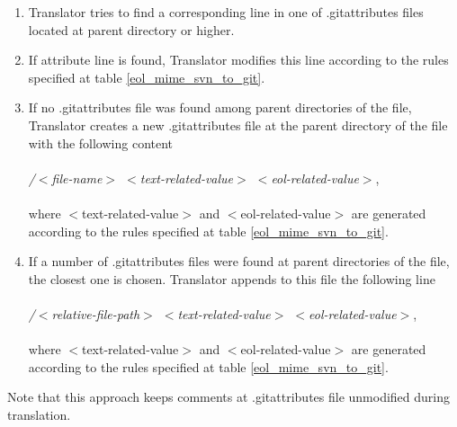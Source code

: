 \begin{enumerate}
\compactlist
\item Translator tries to find a corresponding line in one of .gitattributes files located at parent directory or higher.\\
	
\item If attribute line is found, Translator modifies this line according to the rules specified at table \ref{eol_mime_svn_to_git}.\\
	
\item If no .gitattributes file was found among parent directories of the file, Translator creates a new .gitattributes file at the parent directory of the file with the following content\\\\
\emph{/$<$file-name$>$ $<$text-related-value$>$ $<$eol-related-value$>$},\\\\
where $<$text-related-value$>$ and $<$eol-related-value$>$ are generated according to the rules specified at table \ref{eol_mime_svn_to_git}.\\
	
\item If a number of .gitattributes files were found at parent directories of the file, the closest one is chosen. Translator appends to this file the following line\\\\
\emph{/$<$relative-file-path$>$ $<$text-related-value$>$ $<$eol-related-value$>$},\\\\
where $<$text-related-value$>$ and $<$eol-related-value$>$ are generated according to the rules specified at table \ref{eol_mime_svn_to_git}.
\end{enumerate}

Note that this approach keeps comments at .gitattributes file unmodified during translation.


